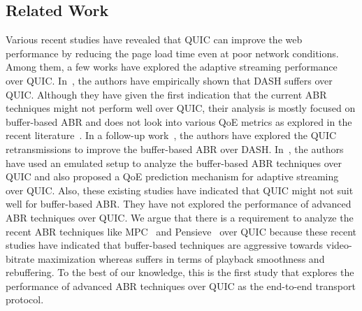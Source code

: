 \subsection{Related Work}
Various recent studies \cite{Biswal2017,Megyesi2016} have revealed that QUIC can improve the web performance by reducing the page load time even at poor network conditions. Among them, a few works have explored the adaptive streaming performance over QUIC. In~\cite{bhat2017not}, the authors have empirically shown that DASH suffers over QUIC. Although they have given the first indication that the current ABR techniques might not perform well over QUIC, their analysis is mostly focused on buffer-based ABR and does not look into various QoE metrics as explored in the recent literature~\cite{yin2015control,mao2017neural}. In a follow-up work~\cite{bhat2018improving}, the authors have explored the QUIC retransmissions to improve the buffer-based ABR over DASH. In~\cite{van2018empirical}, the authors have used an emulated setup to analyze the buffer-based ABR techniques over QUIC and also proposed a QoE prediction mechanism for adaptive streaming over QUIC. Also, these existing studies have indicated that QUIC might not suit well for buffer-based ABR. They have not explored the performance of advanced ABR techniques over QUIC. We argue that there is a requirement to analyze the recent ABR techniques like MPC~\cite{yin2015control} and Pensieve~\cite{mao2017neural} over QUIC because these recent studies have indicated that buffer-based techniques are aggressive towards video-bitrate maximization whereas suffers in terms of playback smoothness and rebuffering. To the best of our knowledge, this is the first study that explores the performance of advanced ABR techniques over QUIC as the end-to-end transport protocol.